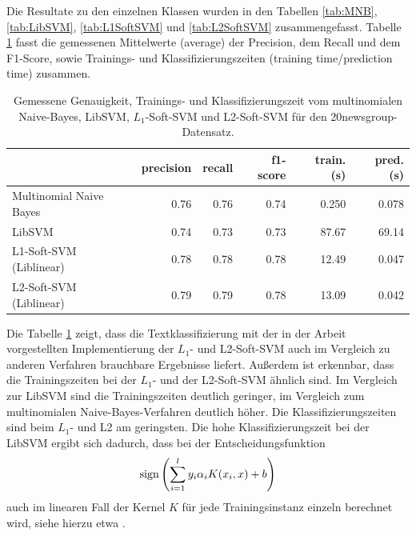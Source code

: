 Die Resultate zu den einzelnen Klassen wurden in den Tabellen \ref{tab:MNB}, \ref{tab:LibSVM}, \ref{tab:L1SoftSVM} und \ref{tab:L2SoftSVM} zusammengefasst. Tabelle \ref{tab:ml-avg} fasst die gemessenen Mittelwerte (average) der Precision, dem Recall und dem F1-Score, sowie Trainings- und Klassifizierungszeiten (training time/prediction time) zusammen. \\

\begin{table}[h!]
\centering
\begin{tabular}{|l | r | r | r | r| r|}
\hline
                            & precision  & recall & f1-score & train. (s) & pred. (s) \\
\hline
Multinomial Naive Bayes   	&0.76      & 0.76     & 0.74& 0.250 & 0.078 \\
LibSVM   					&0.74      & 0.73     & 0.73& 87.67 & 69.14 \\
L1-Soft-SVM (Liblinear)  &0.78      & 0.78     & 0.78& 12.49 & 0.047 \\
L2-Soft-SVM (Liblinear)  &0.79      & 0.79     & 0.78& 13.09 & 0.042 \\
\hline
\end{tabular}
\caption{Gemessene Genauigkeit, Trainings- und Klassifizierungszeit vom multinomialen Naive-Bayes, LibSVM, $L_1$-Soft-SVM und L2-Soft-SVM für den 20newsgroup-Datensatz. }
\label{tab:ml-avg}
\end{table}

Die Tabelle \ref{tab:ml-avg} zeigt, dass die Textklassifizierung mit der in der Arbeit vorgestellten Implementierung der $L_1$- und L2-Soft-SVM auch im Vergleich zu anderen Verfahren brauchbare Ergebnisse liefert. Außerdem ist erkennbar, dass die Trainingszeiten bei der $L_1$- und der L2-Soft-SVM ähnlich sind. Im Vergleich zur LibSVM sind die Trainingszeiten  deutlich geringer, im Vergleich zum multinomialen Naive-Bayes-Verfahren deutlich höher. Die Klassifizierungszeiten sind beim $L_1$- und L2 am geringsten. Die hohe Klassifizierungszeit bei der LibSVM ergibt sich dadurch, dass bei der Entscheidungsfunktion 
$$
\operatorname{sign} \left( \sum_{i= 1}^{l} y_i \alpha_i K(x_i,x) + b \right)
$$ 
auch im linearen Fall der Kernel $K$ für jede Trainingsinstanz einzeln berechnet wird, siehe hierzu etwa \cite{chang-libsvm-11}.